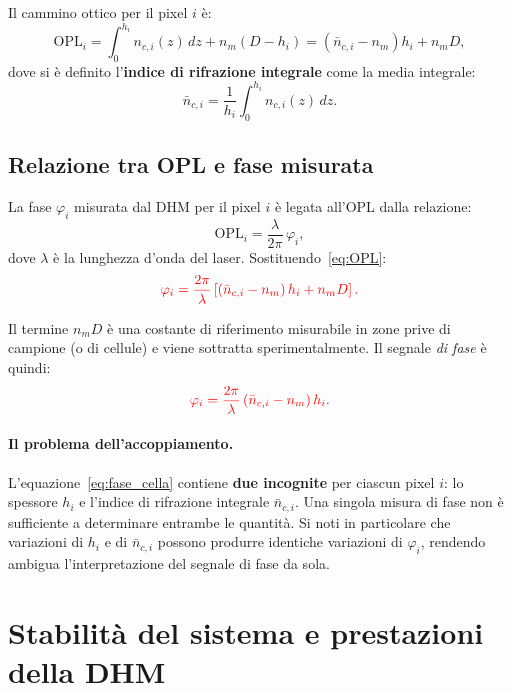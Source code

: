 Il cammino ottico per il pixel $i$ è:
\begin{equation}
  \mathrm{OPL}_i
  = \int_0^{h_i} n_{c,i}(z)\,dz + n_m(D - h_i)
  = \left(\bar{n}_{c,i} - n_m\right)h_i + n_m D,
  \label{eq:OPL}
\end{equation}
dove si è definito l'\textbf{indice di rifrazione integrale} come la media integrale:
\[
  \bar{n}_{c,i} = \frac{1}{h_i}\int_0^{h_i} n_{c,i}(z)\,dz.
\]

\subsection{Relazione tra OPL e fase misurata}

La fase $\varphi_i$ misurata dal DHM per il pixel $i$ è legata all'OPL dalla
relazione:
\[
  \mathrm{OPL}_i = \frac{\lambda}{2\pi}\,\varphi_i,
\]
dove $\lambda$ è la lunghezza d'onda del laser. Sostituendo~\eqref{eq:OPL}:
\begin{equation}
    \color{red}
  \varphi_i = \frac{2\pi}{\lambda}\left[\left(\bar{n}_{c,i} - n_m\right)h_i + n_m D\right].
  \label{eq:fase_completa}
\end{equation}

Il termine $n_m D$ è una costante di riferimento misurabile in zone prive di campione (o di cellule)
e viene sottratta sperimentalmente. Il segnale \emph{di fase} è quindi:
\begin{equation}
  \color{red}
  \varphi_i = \frac{2\pi}{\lambda}\left(\bar{n}_{c,i} - n_m\right)h_i.
  \label{eq:fase_cella}
\end{equation}

\paragraph{Il problema dell'accoppiamento.}
L'equazione~\eqref{eq:fase_cella} contiene \textbf{due incognite} per ciascun
pixel $i$: lo spessore $h_i$ e l'indice di rifrazione integrale
$\bar{n}_{c,i}$. Una singola misura di fase non è sufficiente a determinare
entrambe le quantità. Si noti in particolare che variazioni di $h_i$ e di
$\bar{n}_{c,i}$ possono produrre identiche variazioni di $\varphi_i$, rendendo
ambigua l'interpretazione del segnale di fase da sola.

\section{Stabilità del sistema e prestazioni della DHM}

